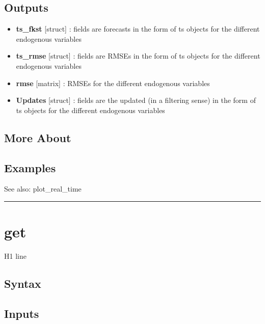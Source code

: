 \documentclass[letterpaper,10pt,english]{sphinxmanual}
\begin{document}
\subsection{Outputs}
\label{classes/models/@dsge/dsge:id54}\begin{itemize}
\item {} 
\textbf{ts\_fkst} {[}struct{]} : fields are forecasts in the form of ts objects
for the different endogenous variables

\item {} 
\textbf{ts\_rmse} {[}struct{]} : fields are RMSEs in the form of ts objects
for the different endogenous variables

\item {} 
\textbf{rmse} {[}matrix{]} : RMSEs for the different endogenous variables

\item {} 
\textbf{Updates} {[}struct{]} : fields are the updated (in a filtering sense) in
the form of ts objects for the different endogenous variables

\end{itemize}


\subsection{More About}
\label{classes/models/@dsge/dsge:id55}

\subsection{Examples}
\label{classes/models/@dsge/dsge:id56}
See also: plot\_real\_time


\bigskip\hrule{}\bigskip



\section{get}
\label{classes/models/@dsge/dsge:id57}\label{classes/models/@dsge/dsge:get}
H1 line


\subsection{Syntax}
\label{classes/models/@dsge/dsge:id58}

\subsection{Inputs}
\label{classes/models/@dsge/dsge:id59}
\end{document}
